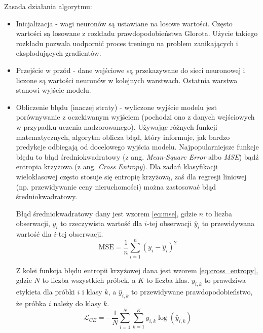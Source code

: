 Zasada działania algorytmu:
\begin{itemize}
    \item Inicjalizacja - wagi neuronów są ustawiane na losowe wartości. Często wartości są losowane z rozkładu prawdopodobieństwa Glorota.
    Użycie takiego rozkładu pozwala uodpornić proces treningu na problem zanikających i eksplodujących gradientów.
    \item Przejście w przód - dane wejściowe są przekazywane do sieci neuronowej i liczone są wartości neuronów w kolejnych warstwach.
    Ostatnia warstwa stanowi wyjście modelu.
    \item Obliczenie błędu (inaczej straty) - wyliczone wyjście modelu jest porównywanie z oczekiwanym wyjściem (pochodzi ono z danych wejściowych w przypadku uczenia nadzorowanego).
    Używając różnych funkcji matematycznych, algorytm oblicza błąd, który informuje, jak bardzo predykcje odbiegają od docelowego wyjścia modelu.
    Najpopularniejsze funkcje błędu to błąd średniokwadratowy (z ang. \textit{Mean-Square Error} albo \textit{MSE}) bądź entropia krzyżowa (z ang. \textit{Cross Entropy}).
    Dla zadań klasyfikacji wieloklasowej często stosuje się entropię krzyżową, zaś dla regresji liniowej (np.
    przewidywanie ceny nieruchomości) można zastosować błąd średniokwadratowy.

    Błąd średniokwadratowy dany jest wzorem \ref{eq:mse}, gdzie $n$ to liczba obserwacji, $y_i$ to rzeczywista wartość dla $i$-tej obserwacji $\hat{y}_i$ to przewidywana wartość dla $i$-tej obserwacji.
    \begin{equation}
        \text{MSE} = \frac{1}{n} \sum_{i=1}^{n} (y_i - \hat{y}_i)^2\label{eq:mse}
    \end{equation}

    Z kolei funkcja błędu entropii krzyżowej dana jest wzorem \ref{eq:cross_entropy}, gdzie $N$ to liczba wszystkich próbek, a $K$ to liczba klas. $y_{i,k}$ to prawdziwa etykieta dla próbki $i$ i klasy $k$, a $\hat{y}_{i,k}$ to przewidywane prawdopodobieństwo, że próbka $i$ należy do klasy $k$.
    \begin{equation}
        \mathcal{L}_{CE} = -\frac{1}{N} \sum_{i=1}^{N} \sum_{k=1}^{K} y_{i,k} \log(\hat{y}_{i,k})\label{eq:cross_entropy}
    \end{equation}


\end{itemize}
